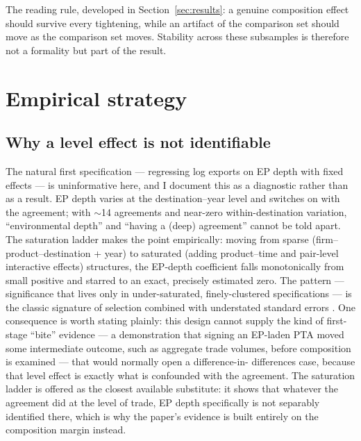 \documentclass[12pt]{article}
\begin{document}
The reading rule, developed in Section~\ref{sec:results}: a genuine composition
effect should survive every tightening, while an artifact of the comparison set
should move as the comparison set moves. Stability across these subsamples is
therefore not a formality but part of the result.

\section{Empirical strategy}\label{sec:strategy}

\subsection{Why a level effect is not identifiable}

The natural first specification --- regressing log exports on EP depth with fixed
effects --- is uninformative here, and I document this as a diagnostic rather than as a
result. EP depth varies at the destination--year level and switches on with the
agreement; with $\sim$14 agreements and near-zero within-destination variation,
``environmental depth'' and ``having a (deep) agreement'' cannot be told apart. The
saturation ladder makes the point empirically: moving from sparse
(firm--product--destination + year) to saturated (adding product--time and pair-level
interactive effects) structures, the EP-depth coefficient falls monotonically from small
positive and starred to an exact, precisely estimated zero. The pattern ---
significance that lives only in under-saturated, finely-clustered specifications --- is
the classic signature of selection combined with understated standard errors
\citep{bertrand2004, goodmanbacon2021}. One consequence is worth stating plainly: this
design cannot supply the kind of first-stage ``bite'' evidence --- a demonstration that
signing an EP-laden PTA moved some intermediate outcome, such as aggregate trade
volumes, before composition is examined --- that would normally open a difference-in-
differences case, because that level effect is exactly what is confounded with the
agreement. The saturation ladder is offered as the closest available substitute: it
shows that whatever the agreement did at the level of trade, EP depth specifically is
not separably identified there, which is why the paper's evidence is built entirely on
the composition margin instead.
\end{document}
